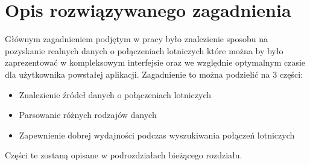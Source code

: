 \documentclass[12pt, twoside]{report}
\begin{document}
\newpage
\chapter{Opis rozwiązywanego zagadnienia}
Głównym zagadnieniem podjętym w pracy było znalezienie sposobu na pozyskanie realnych danych o połączeniach lotniczych które można by było zaprezentować w kompleksowym interfejsie oraz we względnie optymalnym czasie dla użytkownika powstałej aplikacji.
Zagadnienie to można podzielić na 3 części:
\begin{itemize}[noitemsep,topsep=0pt]
\item Znalezienie źródeł danych o połączeniach lotniczych
\item Parsowanie różnych rodzajów danych
\item Zapewnienie dobrej wydajności podczas wyszukiwania połączeń lotniczych
\end{itemize}
Części te zostaną opisane w podrozdziałach bieżącego rozdziału.
\end{document}
